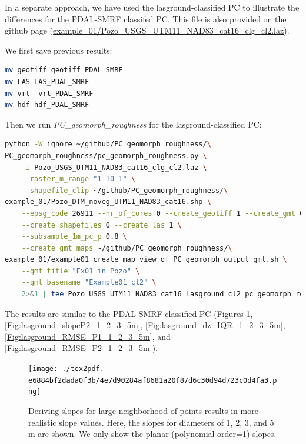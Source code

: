\documentclass[a4paperpaper,,tablecaptionabove]{scrartcl}
\begin{document}
In a separate approach, we have used the lasground-classified PC to
illustrate the differences for the PDAL-SMRF classifed PC. This file is
also provided on the github page
(\href{https://github.com/BodoBookhagen/PC_geomorph_roughness/blob/master/example_01/Pozo_USGS_UTM11_NAD83_cat16_clg_cl2.laz}{example\_01/Pozo\_USGS\_UTM11\_NAD83\_cat16\_clg\_cl2.laz}).

We first save previous results:

\begin{lstlisting}[language=bash]
mv geotiff geotiff_PDAL_SMRF
mv LAS LAS_PDAL_SMRF
mv vrt  vrt_PDAL_SMRF 
mv hdf hdf_PDAL_SMRF
\end{lstlisting}

Then we run \emph{PC\_geomorph\_roughness} for the lasground-classified
PC:

\begin{lstlisting}[language=bash]
python -W ignore ~/github/PC_geomorph_roughness/\
PC_geomorph_roughness/pc_geomorph_roughness.py \
    -i Pozo_USGS_UTM11_NAD83_cat16_clg_cl2.laz \
    --raster_m_range "1 10 1" \
    --shapefile_clip ~/github/PC_geomorph_roughness/\
example_01/Pozo_DTM_noveg_UTM11_NAD83_cat16.shp \
    --epsg_code 26911 --nr_of_cores 0 --create_geotiff 1 --create_gmt 0  \
    --create_shapefiles 0 --create_las 1 \
    --subsample_1m_pc_p 0.8 \
    --create_gmt_maps ~/github/PC_geomorph_roughness/\
example_01/example01_create_map_view_of_PC_geomorph_output_gmt.sh \
    --gmt_title "Ex01 in Pozo" \
    --gmt_basename "Example01_cl2" \
    2>&1 | tee Pozo_USGS_UTM11_NAD83_cat16_lasground_cl2_pc_geomorph_roughness_subsample_p08_1_10_1.log
\end{lstlisting}

The results are similar to the PDAL-SMRF classified PC (Figures
\ref{Fig:lasground_slopeP1_1_2_3_5m},
\ref{Fig:lasground_slopeP2_1_2_3_5m},
\ref{Fig:lasground_dz_IQR_1_2_3_5m},
\ref{Fig:lasground_RMSE_P1_1_2_3_5m}, and
\ref{Fig:lasground_RMSE_P2_1_2_3_5m}).

\begin{figure}
\centering
\texttt{[image: ./tex2pdf.-e6884bf2dada0f3b/4e7d90284af8681a20f87d6c30d94d723c0d4fa3.png]}
\caption{Deriving slopes for large neighborhood of points results in
more realistic slope values. Here, the slopes for diameters of 1, 2, 3,
and 5 m are shown. We only show the planar (polynomial order=1) slopes.
\label{Fig:lasground_slopeP1_1_2_3_5m}}
\end{figure}
\end{document}
